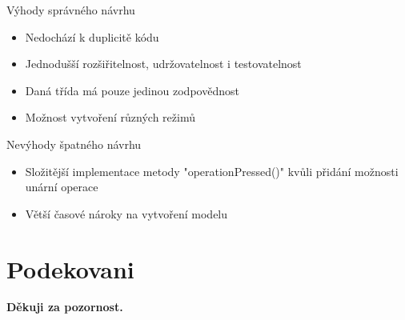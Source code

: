 \begin{frame}
	\vfill
	\begin{block}{Výhody správného návrhu}
		\begin{itemize}
			\item Nedochází k duplicitě kódu
			\item Jednodušší rozšiřitelnost, udržovatelnost i testovatelnost
			\item Daná třída má pouze jedinou zodpovědnost
			\item Možnost vytvoření různých režimů
		\end{itemize}
	\end{block}
	\begin{block}{Nevýhody špatného návrhu}
		\begin{itemize}
			\item Složitější implementace metody "operationPressed()" kvůli přidání možnosti unární operace
			\item Větší časové nároky na vytvoření modelu
		\end{itemize}
	\end{block}
\end{frame}
\section{Podekovani}
\begin{frame}
	\vfill
  \begin{center}
  {\Large \bfseries
    Děkuji za pozornost.
    } 
  \end{center}
\end{frame}

